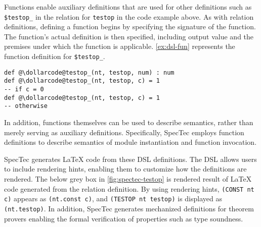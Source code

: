 Functions enable auxiliary definitions that are used for other definitions such
as \texttt{\$testop\_} in the relation for \texttt{testop} in the code example
above.
As with relation definitions, defining a function begins by specifying the
signature of the function.
The function's actual definition is then specified, including output value and
the premises under which the function is applicable.
\cref{ex:dsl-fun} represents the function definition for \texttt{\$testop\_}.
\newpage
\begin{example}
\begin{lstlisting}[style=dsl]
def @\dollarcode@testop_(nt, testop, num) : num
def @\dollarcode@testop_(nt, testop, c) = 1
-- if c = 0
def @\dollarcode@testop_(nt, testop, c) = 1
-- otherwise
\end{lstlisting}
  \label{ex:dsl-fun}
\end{example}
In addition, functions themselves can be used to describe semantics, rather
than merely serving as auxiliary definitions.
Specifically, SpecTec employs function definitions to describe semantics of module
instantiation and function invocation.


SpecTec generates LaTeX code from these DSL definitions.
The DSL allows users to include rendering hints, enabling them to customize how
the definitions are rendered.
The below grey box in \cref{fig:spectec-testop} is rendered result of
LaTeX code generated from the relation definition.
By using rendering hints, \texttt{(CONST nt c)} appears as \texttt{(nt.const
c)}, and \texttt{(TESTOP nt testop)} is displayed as \texttt{(nt.testop)}.
In addition, SpecTec generates mechanized definitions for theorem provers
enabling the formal verification of properties such as type soundness.
